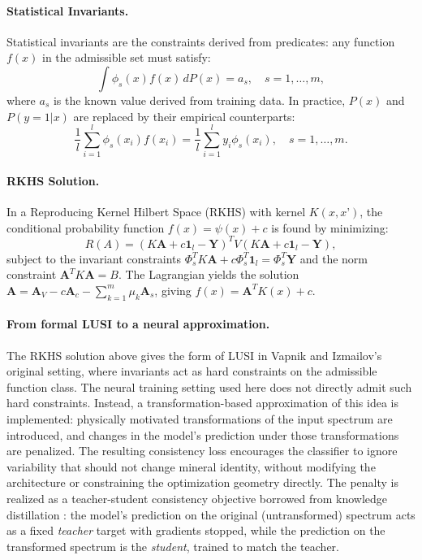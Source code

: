 \documentclass[11pt]{report}
\begin{document}
\paragraph{Statistical Invariants.}
Statistical invariants are the constraints derived from predicates: any function $f(x)$ in the admissible set must satisfy:
\[
\int \phi_s(x) f(x) \, dP(x) = a_s, \quad s = 1, \ldots, m,
\]
where $a_s$ is the known value derived from training data. In practice, $P(x)$ and $P(y = 1 | x)$ are replaced by their empirical counterparts:
\[
\frac{1}{l} \sum_{i=1}^l \phi_s(x_i) f(x_i) = \frac{1}{l} \sum_{i=1}^l y_i \phi_s(x_i), \quad s = 1, \ldots, m.
\]

\paragraph{RKHS Solution.}
In a Reproducing Kernel Hilbert Space (RKHS) with kernel $K(x, x’)$, the conditional probability function $f(x) = \psi(x) + c$ is found by minimizing:
\[
R(A) = (K \mathbf{A} + c \mathbf{1}_l - \mathbf{Y})^T V (K \mathbf{A} + c \mathbf{1}_l - \mathbf{Y}),
\]
subject to the invariant constraints $\Phi_s^T K \mathbf{A} + c \Phi_s^T \mathbf{1}_l = \Phi_s^T \mathbf{Y}$ and the norm constraint $\mathbf{A}^T K \mathbf{A} = B$. The Lagrangian yields the solution $\mathbf{A} = \mathbf{A}_V - c \mathbf{A}_c - \sum_{k=1}^m \mu_k \mathbf{A}_s$, giving $f(x) = \mathbf{A}^T K(x) + c$.

\paragraph{From formal LUSI to a neural approximation.}
The RKHS solution above gives the form of LUSI in Vapnik and Izmailov's original setting, where invariants act as hard constraints on the admissible function class. The neural training setting used here does not directly admit such hard constraints. Instead, a transformation-based approximation of this idea is implemented: physically motivated transformations of the input spectrum are introduced, and changes in the model's prediction under those transformations are penalized. The resulting consistency loss encourages the classifier to ignore variability that should not change mineral identity, without modifying the architecture or constraining the optimization geometry directly. The penalty is realized as a teacher-student consistency objective borrowed from knowledge distillation \cite{hinton2015distilling}: the model's prediction on the original (untransformed) spectrum acts as a fixed \emph{teacher} target with gradients stopped, while the prediction on the transformed spectrum is the \emph{student}, trained to match the teacher.
\end{document}
